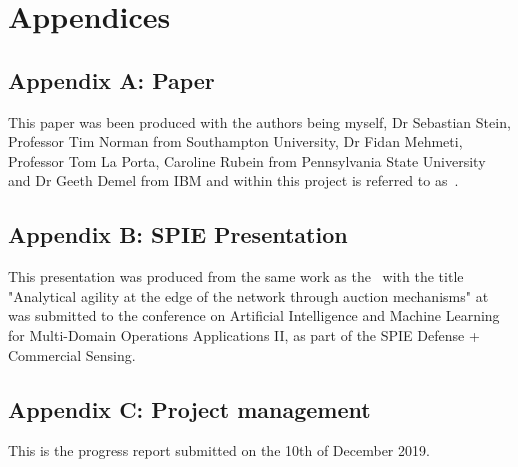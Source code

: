 
\chapter*{Appendices}
\section*{Appendix A: Paper} \label{app:aamas_paper}
This paper was been produced with the authors being myself, Dr Sebastian Stein, Professor Tim Norman from Southampton
University, Dr Fidan Mehmeti, Professor Tom La Porta, Caroline Rubein from Pennsylvania State University and Dr Geeth
Demel from IBM and within this project is referred to as~\cite{FlexibleResourceAllocation}.



\section*{Appendix B: SPIE Presentation} \label{app:spie_presentation}
This presentation was produced from the same work as the~\cite{FlexibleResourceAllocation} with the title "Analytical
agility at the edge of the network through auction mechanisms" at was submitted to the conference on Artificial
Intelligence and Machine Learning for Multi-Domain Operations Applications II, as part of the SPIE Defense + Commercial
Sensing.



\section*{Appendix C: Project management} \label{app:progress_report}
This is the progress report submitted on the 10th of December 2019.



